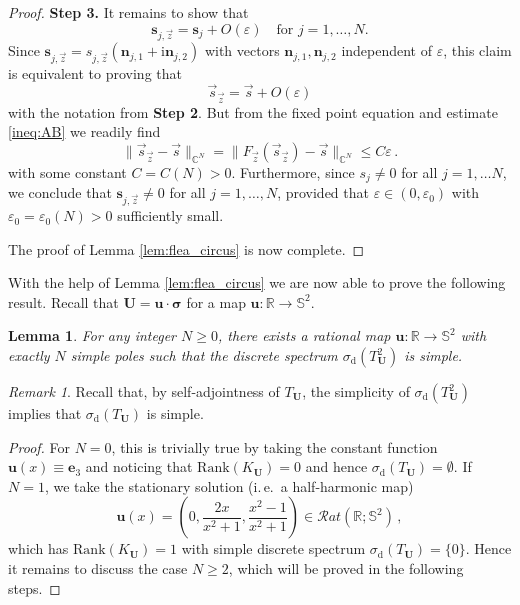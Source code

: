 \documentclass[11pt,reqno]{amsart}
\newtheorem{lem}{Lemma}[section]
\theoremstyle{definition}
\theoremstyle{remark}
\theoremstyle{remark}
\newtheorem*{remark*}{Remark}
\numberwithin{equation}{section}
\newcommand{\C}{\mathbb{C}}
\newcommand{\R}{\mathbb{R}}
\newcommand{\Ss}{\mathbb{S}}
\newcommand{\sv}{\mathbf{s}}
\newcommand{\nv}{\mathbf{n}}
\newcommand{\eps}{\varepsilon}
\newcommand{\ii}{\mathrm{i}}
\newcommand{\uu}{\mathbf{u}}
\newcommand{\Ub}{\mathbf{U}}
\begin{document}
\begin{appendix}
\begin{proof}
\medskip
\textbf{Step 3.} It remains to show  that
$$
 \sv_{j,\vec{z}} = \sv_{j} + O(\eps) \quad \mbox{for $j=1, \ldots, N$}.
$$
Since $\sv_{j,\vec{z}} = s_{j,\vec{z}} ( \nv_{j,1}+\ii \nv_{j,2})$ with vectors $\nv_{j,1}, \nv_{j,2}$ independent of $\eps$, this claim is equivalent to proving that 
$$
 \vec{s}_{\vec{z}} = \vec{s} + O(\eps)
$$ 
 with the notation from \textbf{Step 2}. But from the fixed point equation and estimate \eqref{ineq:AB} we readily find
$$
\| \vec{s}_{\vec{z}} - \vec{s} \|_{\C^N} = \| F_{\vec{z}}(\vec{s}_{\vec{z}}) - \vec{s} \|_{\C^N} \leq C \eps \, .
$$
with some constant $C=C(N) > 0$. Furthermore, since $s_j \neq 0$ for all $j =1, \ldots N$, we conclude that $\sv_{j,\vec{z}} \neq 0$ for all $j=1, \ldots, N$, provided that $\eps \in (0, \eps_0)$ with $\eps_0=\eps_0(N) > 0$  sufficiently small. 

The proof of Lemma \ref{lem:flea_circus} is now complete.
\end{proof}

With the help of Lemma \ref{lem:flea_circus} we are now able to prove the following result. Recall that $\Ub = \uu \cdot \bm{\sigma}$ for a map $\uu : \R \to \Ss^2$.



\begin{lem} \label{lem:T_simple_exist}
For any integer $N \geq 0$,  there exists a rational map $\uu : \R \to \Ss^2$ with exactly $N$ simple poles such that the discrete spectrum $\sigma_{\mathrm{d}}(T_\Ub^2)$ is simple. 
\end{lem}

\begin{remark*}
Recall that, by self-adjointness of $T_\Ub$, the simplicity of $\sigma_{\mathrm{d}}(T_\Ub^2)$ implies that $\sigma_{\mathrm{d}}(T_\Ub)$ is simple.
\end{remark*}

\begin{proof}
For $N=0$, this is trivially true by taking the constant function $\uu(x) \equiv \mathbf{e}_3$ and noticing that $\mathrm{Rank}(K_\Ub)=0$ and hence $\sigma_{\mathrm{d}}(T_\Ub) = \emptyset$. If $N=1$, we take the stationary solution (i.\,e.~a half-harmonic map)
$$
\uu(x) = \left (0, \frac{2x}{x^2+1}, \frac{x^2-1}{x^2+1} \right ) \in \mathcal{R}at(\R; \Ss^2) \, ,
$$
 which has $\mathrm{Rank}(K_{\Ub}) = 1$ with simple discrete spectrum $\sigma_{\mathrm{d}}(T_\Ub) = \{0 \}$. Hence it remains to discuss the case $N \geq 2$, which will be proved in the following steps.
 
 \medskip


\end{proof}
\end{appendix}
\end{document}
